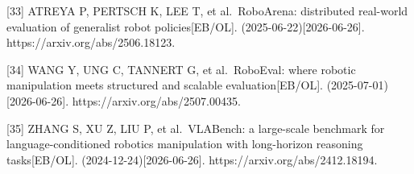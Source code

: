 \documentclass[
  chinese,
]{ctexart}
\begin{document}
{[}33{]} ATREYA P, PERTSCH K, LEE T, et al.~RoboArena: distributed
real-world evaluation of generalist robot policies{[}EB/OL{]}.
(2025-06-22){[}2026-06-26{]}. https://arxiv.org/abs/2506.18123.

{[}34{]} WANG Y, UNG C, TANNERT G, et al.~RoboEval: where robotic
manipulation meets structured and scalable evaluation{[}EB/OL{]}.
(2025-07-01){[}2026-06-26{]}. https://arxiv.org/abs/2507.00435.

{[}35{]} ZHANG S, XU Z, LIU P, et al.~VLABench: a large-scale benchmark
for language-conditioned robotics manipulation with long-horizon
reasoning tasks{[}EB/OL{]}. (2024-12-24){[}2026-06-26{]}.
https://arxiv.org/abs/2412.18194.
\end{document}

